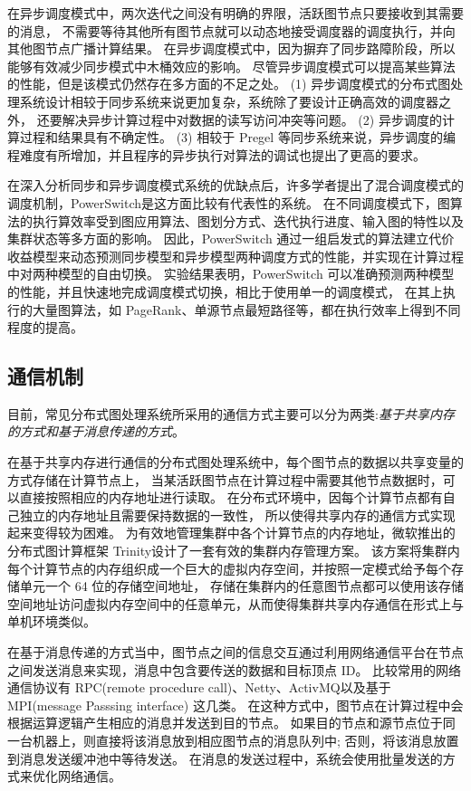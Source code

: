 在异步调度模式中，两次迭代之间没有明确的界限，活跃图节点只要接收到其需要的消息，
不需要等待其他所有图节点就可以动态地接受调度器的调度执行，并向其他图节点广播计算结果。
在异步调度模式中，因为摒弃了同步路障阶段，所以能够有效减少同步模式中木桶效应的影响。
尽管异步调度模式可以提高某些算法的性能，但是该模式仍然存在多方面的不足之处。
(1) 异步调度模式的分布式图处理系统设计相较于同步系统来说更加复杂，系统除了要设计正确高效的调度器之外，
还要解决异步计算过程中对数据的读写访问冲突等问题。
(2) 异步调度的计算过程和结果具有不确定性。
(3) 相较于 Pregel 等同步系统来说，异步调度的编程难度有所增加，并且程序的异步执行对算法的调试也提出了更高的要求。

在深入分析同步和异步调度模式系统的优缺点后，许多学者提出了混合调度模式的调度机制，PowerSwitch\cite{Xie@PPoPP15}是这方面比较有代表性的系统。
在不同调度模式下，图算法的执行算效率受到图应用算法、图划分方式、迭代执行进度、输入图的特性以及集群状态等多方面的影响。
因此，PowerSwitch 通过一组启发式的算法建立代价收益模型来动态预测同步模型和异步模型两种调度方式的性能，并实现在计算过程中对两种模型的自由切换。
实验结果表明，PowerSwitch 可以准确预测两种模型的性能，并且快速地完成调度模式切换，相比于使用单一的调度模式，
在其上执行的大量图算法，如 PageRank、单源节点最短路径等，都在执行效率上得到不同程度的提高。

\subsection{通信机制}

目前，常见分布式图处理系统所采用的通信方式主要可以分为两类:\textit{基于共享内存的方式和基于消息传递的方式}。
        
在基于共享内存进行通信的分布式图处理系统中，每个图节点的数据以共享变量的方式存储在计算节点上，
当某活跃图节点在计算过程中需要其他节点数据时，可以直接按照相应的内存地址进行读取。
在分布式环境中，因每个计算节点都有自己独立的内存地址且需要保持数据的一致性，
所以使得共享内存的通信方式实现起来变得较为困难。
为有效地管理集群中各个计算节点的内存地址，微软推出的分布式图计算框架 Trinity\cite{Shao@SIGMOD13}设计了一套有效的集群内存管理方案。
该方案将集群内每个计算节点的内存组织成一个巨大的虚拟内存空间，并按照一定模式给予每个存储单元一个 64 位的存储空间地址，
存储在集群内的任意图节点都可以使用该存储空间地址访问虚拟内存空间中的任意单元，从而使得集群共享内存通信在形式上与单机环境类似。

在基于消息传递的方式当中，图节点之间的信息交互通过利用网络通信平台在节点之间发送消息来实现，消息中包含要传送的数据和目标顶点 ID。
比较常用的网络通信协议有
RPC(remote procedure call)\cite{rpc}、Netty\cite{netty}、ActivMQ\cite{activemq}以及基于 MPI(message Passsing interface)\cite{mpi}
这几类。
在这种方式中，图节点在计算过程中会根据运算逻辑产生相应的消息并发送到目的节点。
如果目的节点和源节点位于同一台机器上，则直接将该消息放到相应图节点的消息队列中;
否则，将该消息放置到消息发送缓冲池中等待发送。
在消息的发送过程中，系统会使用批量发送的方式来优化网络通信。

